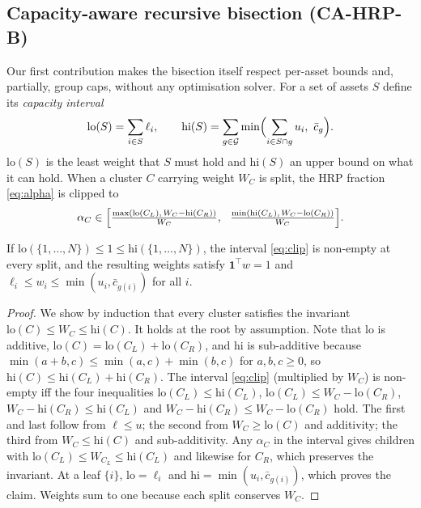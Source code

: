 \subsection{Capacity-aware recursive bisection (CA-HRP-B)}
Our first contribution makes the bisection itself respect per-asset bounds and, partially,
group caps, without any optimisation solver. For a set of assets $S$ define its
\emph{capacity interval}
\begin{equation}\label{eq:capacity}
\mathrm{lo}(S)=\sum_{i\in S}\ell_i,\qquad
\mathrm{hi}(S)=\sum_{g\in\mathcal{G}}\min\Bigl(\sum_{i\in S\cap g}u_i,\ \bar c_g\Bigr).
\end{equation}
$\mathrm{lo}(S)$ is the least weight that $S$ must hold and $\mathrm{hi}(S)$ an upper
bound on what it can hold. When a cluster $C$ carrying weight $W_C$ is split, the HRP
fraction \eqref{eq:alpha} is clipped to
\begin{equation}\label{eq:clip}
\alpha_C\in\Bigl[\tfrac{\max(\mathrm{lo}(C_L),\,W_C-\mathrm{hi}(C_R))}{W_C},\ \
\tfrac{\min(\mathrm{hi}(C_L),\,W_C-\mathrm{lo}(C_R))}{W_C}\Bigr].
\end{equation}

\begin{proposition}\label{prop:box}
If $\mathrm{lo}(\{1,\dots,N\})\le 1\le \mathrm{hi}(\{1,\dots,N\})$, the interval
\eqref{eq:clip} is non-empty at every split, and the resulting weights satisfy
$\mathbf{1}^\top w=1$ and $\ell_i\le w_i\le\min(u_i,\bar c_{g(i)})$ for all $i$.
\end{proposition}
\begin{proof}
We show by induction that every cluster satisfies the invariant
$\mathrm{lo}(C)\le W_C\le \mathrm{hi}(C)$. It holds at the root by assumption. Note that
$\mathrm{lo}$ is additive, $\mathrm{lo}(C)=\mathrm{lo}(C_L)+\mathrm{lo}(C_R)$, and
$\mathrm{hi}$ is sub-additive because $\min(a+b,c)\le\min(a,c)+\min(b,c)$ for
$a,b,c\ge0$, so $\mathrm{hi}(C)\le\mathrm{hi}(C_L)+\mathrm{hi}(C_R)$. The interval
\eqref{eq:clip} (multiplied by $W_C$) is non-empty iff the four inequalities
$\mathrm{lo}(C_L)\le\mathrm{hi}(C_L)$, $\mathrm{lo}(C_L)\le W_C-\mathrm{lo}(C_R)$,
$W_C-\mathrm{hi}(C_R)\le\mathrm{hi}(C_L)$ and $W_C-\mathrm{hi}(C_R)\le W_C-\mathrm{lo}(C_R)$
hold. The first and last follow from $\ell\le u$; the second from
$W_C\ge\mathrm{lo}(C)$ and additivity; the third from $W_C\le\mathrm{hi}(C)$ and
sub-additivity. Any $\alpha_C$ in the interval gives children with
$\mathrm{lo}(C_L)\le W_{C_L}\le\mathrm{hi}(C_L)$ and likewise for $C_R$, which preserves
the invariant. At a leaf $\{i\}$, $\mathrm{lo}=\ell_i$ and $\mathrm{hi}=\min(u_i,\bar
c_{g(i)})$, which proves the claim. Weights sum to one because each split conserves
$W_C$.
\end{proof}

